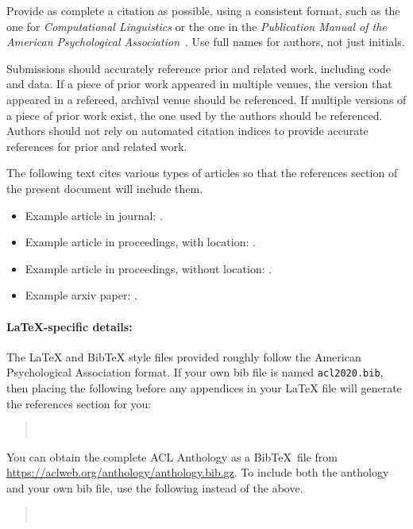 \documentclass[11pt,a4paper]{article}
\begin{document}
Provide as complete a citation as possible, using a consistent format, such as the one for \emph{Computational Linguistics\/} or the one in the  \emph{Publication Manual of the American 
Psychological Association\/}~\citep{APA:83}.
Use full names for authors, not just initials.

Submissions should accurately reference prior and related work, including code and data.
If a piece of prior work appeared in multiple venues, the version that appeared in a refereed, archival venue should be referenced.
If multiple versions of a piece of prior work exist, the one used by the authors should be referenced.
Authors should not rely on automated citation indices to provide accurate references for prior and related work.

The following text cites various types of articles so that the references section of the present document will include them.
\begin{itemize}
\item Example article in journal: \citep{Ando2005}.
\item Example article in proceedings, with location: \citep{borschinger-johnson-2011-particle}.
\item Example article in proceedings, without location: \citep{andrew2007scalable}.
\item Example arxiv paper: \citep{rasooli-tetrault-2015}. 
\end{itemize}


\paragraph{\LaTeX-specific details:}
The \LaTeX{} and Bib\TeX{} style files provided roughly follow the American Psychological Association format.
If your own bib file is named \texttt{\small acl2020.bib}, then placing the following before any appendices in your \LaTeX{}  file will generate the references section for you:
\begin{quote}\small
\verb||\\
\verb||
\end{quote}

You can obtain the complete ACL Anthology as a Bib\TeX\ file from \url{https://aclweb.org/anthology/anthology.bib.gz}.
To include both the anthology and your own bib file, use the following instead of the above.
\begin{quote}\small
\verb||\\
\verb||
\end{quote}
\end{document}
